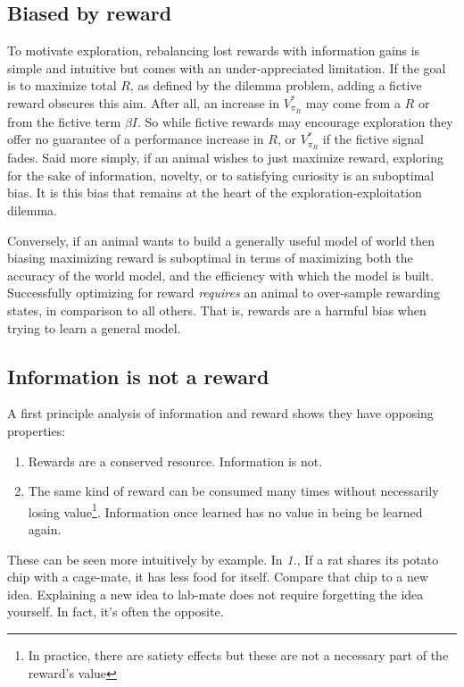 \documentclass[9pt,twocolumn,twoside]{pnas-new}
\begin{document}
\subsection*{Biased by reward}
To motivate exploration, rebalancing lost rewards with information gains is simple and intuitive but comes with an under-appreciated limitation. If the goal is to maximize total $R$, as defined by the dilemma problem, adding a fictive reward obscures this aim. After all, an increase in $V^{*}_{\pi_R}$ may come from a $R$ or from the fictive term $\beta I$. So while fictive rewards may encourage exploration they offer no guarantee of a performance increase in $R$, or $V^{*}_{\pi_R}$ if the fictive signal fades. Said more simply, if an animal wishes to just maximize reward, exploring for the sake of information, novelty, or to satisfying curiosity is an suboptimal bias. It is this bias that remains at the heart of the exploration-exploitation dilemma.

Conversely, if an animal wants to build a generally useful model of world then biasing maximizing reward is suboptimal in terms of maximizing both the accuracy of the world model, and the efficiency with which the model is built. Successfully optimizing for reward \textit{requires} an animal to over-sample rewarding states, in comparison to all others. That is, rewards are a harmful bias when trying to learn a general model.


\subsection*{Information is not a reward}
A first principle analysis of information and reward shows they have opposing properties:

\begin{enumerate}[noitemsep,wide=0pt,leftmargin=\dimexpr\labelwidth]
    \item Rewards are a conserved resource. Information is not. 
    \item The same kind of reward can be consumed many times without necessarily losing value\footnote{In practice, there are satiety effects but these are not a necessary part of the reward's value}. Information once learned has no value in being be learned again.
\end{enumerate}

These can be seen more intuitively by example. In \textit{1.}, If a rat shares its potato chip with a cage-mate, it has less food for itself. Compare that chip to a new idea. Explaining a new idea to lab-mate does not require forgetting the idea yourself. In fact, it's often the opposite.
\end{document}
